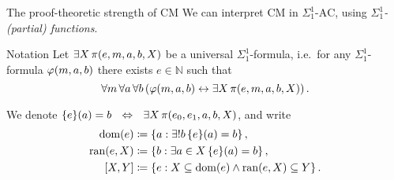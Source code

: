 \documentclass{beamer}
\DeclareMathOperator{\dom}{dom}
\DeclareMathOperator{\ran}{ran}
\begin{document}
\begin{frame}{The proof-theoretic strength of $\mathrm{CM}$}
  We can interpret $\mathrm{CM}$ in $\Sigma^1_1$-$\mathrm{AC}$, using \emph{$\Sigma^1_1$-(partial) functions}.

  \begin{block}{Notation}
    Let $\exists X \, \pi\mleft(e, m, a, b, X\mright)$ be a universal $\Sigma^1_1$-formula, i.e.\ for any $\Sigma^1_1$-formula $\varphi\mleft(m, a, b\mright)$ there exists $e \in \mathbb{N}$ such that
    \[\forall m \, \forall a \, \forall b \left(\varphi\mleft(m, a, b\mright) \leftrightarrow \exists X \, \pi\mleft(e, m, a, b, X\mright)\right).\]

    We denote $\mleft\{e\mright\}\mleft(a\mright) = b \ \ \ratio\Leftrightarrow \ \ \exists X \, \pi\mleft(e_0, e_1, a, b, X\mright)$, and write
    \begin{align*}
      \dom\mleft(e\mright)    & \coloneqq \left\{a : \exists!b \, \mleft\{e\mright\}\mleft(a\mright) = b\right\},                        \\
      \ran\mleft(e, X\mright) & \coloneqq \left\{b : \exists a \in X \, \mleft\{e\mright\}\mleft(a\mright) = b\right\},                  \\
      \left[X, Y\right]       & \coloneqq \left\{e : X \subseteq \dom\mleft(e\mright) \land \ran\mleft(e, X\mright) \subseteq Y\right\}.
    \end{align*}
  \end{block}
\end{frame}
\end{document}
